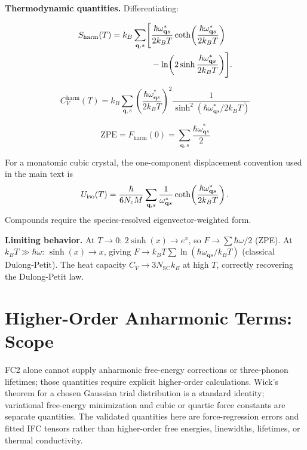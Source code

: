 \documentclass[aps,prb,reprint,amsmath,amssymb,floatfix]{revtex4-2}
\begin{document}
\textbf{Thermodynamic quantities.} Differentiating:

\color{revisionblue}
\begin{equation*}
\begin{aligned}
S_{\rm harm}(T)=k_B\sum_{\mathbf q,s}\Biggl[
 &\frac{\hbar\omega_{\mathbf q s}^*}{2k_BT}
 \coth\!\left(\frac{\hbar\omega_{\mathbf q s}^*}{2k_BT}\right)\\
 &-\ln\!\left(2\sinh\frac{\hbar\omega_{\mathbf q s}^*}{2k_BT}\right)
 \Biggr].
\end{aligned}
\end{equation*}
\color{black}

\begin{equation*}
C_V^\text{harm}(T) = k_B\sum_{\mathbf{q},s}\left(\frac{\hbar\omega_{\mathbf{q}s}^*}{2k_BT}\right)^2\frac{1}{\sinh^2\!\left(\hbar\omega_{\mathbf{q}s}^*/2k_BT\right)}
\end{equation*}

\begin{equation*}
\text{ZPE} = F_\text{harm}(0) = \sum_{\mathbf{q},s}\frac{\hbar\omega_{\mathbf{q}s}^*}{2}
\end{equation*}

\color{revisionblue}
For a monatomic cubic crystal, the one-component displacement convention used
in the main text is
\begin{equation*}
U_{\rm iso}(T)=\frac{\hbar}{6N_cM}\sum_{\mathbf q,s}
\frac{1}{\omega_{\mathbf q s}^*}
\coth\!\left(\frac{\hbar\omega_{\mathbf q s}^*}{2k_BT}\right).
\end{equation*}
Compounds require the species-resolved eigenvector-weighted form.
\color{black}

\textbf{Limiting behavior.} At \(T\to 0\): \(2\sinh(x)\to e^x\), so
\(F\to\sum\hbar\omega/2\) (ZPE). At \(k_BT\gg\hbar\omega\):
\(\sinh(x)\to x\), giving
\(F\to k_BT\sum\ln(\hbar\omega_{\mathbf{q}s}/k_BT)\) (classical
Dulong-Petit). The heat capacity \(C_V\to 3N_\text{SC}k_B\) at high
\(T\), correctly recovering the Dulong-Petit law.

\color{revisionblue}
\section{Higher-Order Anharmonic Terms: Scope}
\label{appendix-i-anharmonic-free-energy-wicks-theorem-and-perturbation-theory}
\color{black}

\color{revisionblue}
FC2 alone cannot supply anharmonic free-energy corrections or three-phonon
lifetimes; those quantities require explicit higher-order calculations. Wick's
theorem for a chosen Gaussian trial distribution is a standard identity;
variational free-energy minimization and cubic or quartic force constants are
separate quantities. The validated quantities here are force-regression errors
and fitted IFC tensors rather than higher-order free energies, linewidths,
lifetimes, or thermal conductivity.
\color{black}
\end{document}
